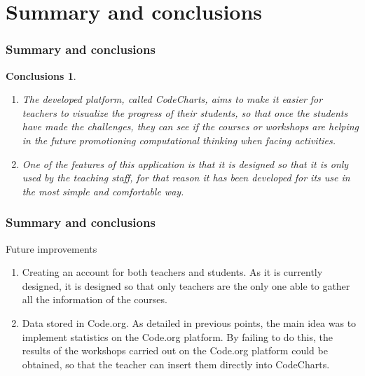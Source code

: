 \documentclass{beamer}
\newtheorem{ejemplo}{Conclusions}
\begin{document}
\section{Summary and conclusions}

\begin{frame}
\frametitle{Summary and conclusions}

\begin{ejemplo}
  \begin{enumerate}
    \item
    The developed platform, called CodeCharts, aims to make it easier for teachers to visualize the progress of their students, so that once the students have made the challenges, they can see if the courses or workshops are helping in the future promotioning computational thinking when facing activities.
      \pause
    \item
    One of the features of this application is that it is designed so that it is only used by the teaching staff, for that reason it has been developed for its use in the most simple and comfortable way.
  \end{enumerate}
\end{ejemplo}

\end{frame}
\begin{frame}
\frametitle{Summary and conclusions}

\begin{block}{Future improvements}
    \begin{enumerate}
    \item
    Creating an account for both teachers and students. As it is currently designed, it is designed so that only teachers are the only one able to gather all the information of the courses.
    \item
    Data stored in Code.org. As detailed in previous points, the main idea was to implement statistics on the Code.org platform. By failing to do this, the results of the workshops carried out on the Code.org platform could be obtained, so that the teacher can insert them directly into CodeCharts.
    \end{enumerate}
\end{block}

\end{frame}
\end{document}
